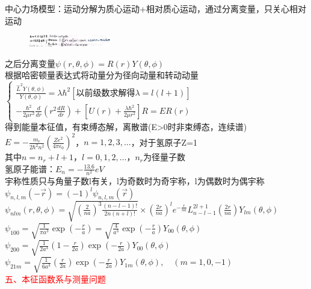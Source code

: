 \documentclass[a4paper,8pt]{extarticle} %
\newcommand{\redtext}[1]{\textcolor{red}{#1}}
\begin{document}
\begin{multicols}{3}
中心力场模型：运动分解为质心运动+相对质心运动，通过分离变量，只关心相对运动\\
\begin{figure}[H]
    \vspace{-0.5cm}
    \centering
    \includegraphics[width=0.32\textwidth]{images/30.png}
    \vspace{-0.6cm}
\end{figure}
之后分离变量$\psi(r,\theta,\phi) = R(r)Y(\theta,\phi)$\\
根据哈密顿量表达式将动量分为径向动量和转动动量\\
$\begin{cases}
    \frac{\hat{L}^2Y(\theta,\phi)}{Y(\theta,\phi)} = \lambda\hbar^2\left[\text{以前级数求解得}\lambda = l(l+1)\right] \\[2ex]
    -\frac{\hbar^2}{2\mu r^2}\frac{d}{dr}\left(r^2\frac{dR}{dr}\right) + \left[U(r) + \frac{\lambda\hbar^2}{2\mu r^2}\right]R = ER(r)
    \end{cases}$\\
得到能量本征值，有束缚态解，离散谱(E>0时非束缚态，连续谱)\\
$E = -\frac{m_e}{2\hbar^2n^2}(\frac{Ze^2}{4\pi\epsilon_0})^2$，$n=1,2,3,\dots$，对于氢原子Z=1\\
其中$n=n_r+l+1$，$l=0,1,2,\dots$，$n_r$为径量子数\\
氢原子能谱：$E_n = -\frac{13.6}{n^2}eV$\\
宇称性质只与角量子数l有关，l为奇数时为奇宇称，l为偶数时为偶宇称\\
$\psi_{n,l,m}(-\vec{r}) = (-1)^l\psi_{n,l,m}(\vec{r})$\\
$\psi_{nlm}(r,\theta,\phi) = \sqrt{\left(\frac{2}{na}\right)^3 \frac{(n-l-1)!}{2n(n+l)!}} \times \left(\frac{2r}{na}\right)^l e^{-\frac{r}{na}} L_{n-l-1}^{2l+1}\left(\frac{2r}{na}\right)Y_{lm}(\theta,\phi)$\\
$\psi_{100} = \sqrt{\frac{1}{\pi a^3}}\exp\left(-\frac{r}{a}\right) = \sqrt{\frac{4}{a^3}}\exp\left(-\frac{r}{a}\right)Y_{00}(\theta,\phi)$\\
$\psi_{200} = \sqrt{\frac{1}{2a^3}}\left(1-\frac{r}{2a}\right)\exp\left(-\frac{r}{2a}\right)Y_{00}(\theta,\phi)$\\
$\psi_{21m} = \sqrt{\frac{1}{6a^3}}\left(\frac{r}{2a}\right)\exp\left(-\frac{r}{2a}\right)Y_{1m}(\theta,\phi), \quad (m=1,0,-1)$\\
\redtext{五、本征函数系与测量问题}


\end{multicols}
\end{document}
